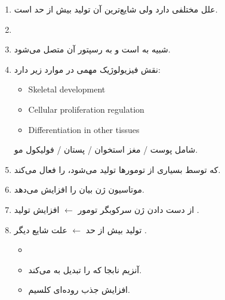 \documentclass[a4paper,12pt]{article}
\begin{document}
\begin{enumerate}[label=\arabic*.,start=3]
\item {} علل مختلفی دارد ولی شایع‌ترین آن تولید بیش از حد  است.
\item {}
\item {} شبیه به  است و به رسپتور آن متصل می‌شود.
\item {} نقش فیزیولوژیک مهمی در موارد زیر دارد:
\begin{latin}
\begin{itemize}
\item Skeletal development
\item Cellular proliferation regulation
\item Differentiation in other tissues
\end{itemize}
\end{latin}
شامل پوست / مغز استخوان / پستان / فولیکول مو.
\item {} که توسط بسیاری از تومورها تولید می‌شود،  را فعال می‌کند.
\item موتاسیون ژن  بیان  را افزایش می‌دهد.
\item از دست دادن ژن سرکوبگر تومور  $\leftarrow$ افزایش تولید .
\item تولید بیش از حد  $\leftarrow$ علت شایع دیگر .
\begin{itemize}
\item {}
\item آنزیم نابجا که  را تبدیل به  می‌کند.
\item افزایش جذب روده‌ای کلسیم.
\end{itemize}
\end{enumerate}
\end{document}
